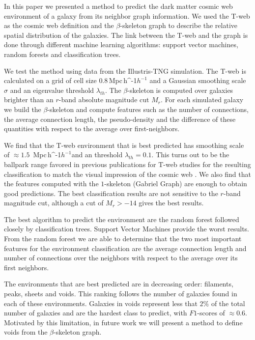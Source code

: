\documentclass[usenatbib]{mnras}
\newcommand{\Mpch}{\,{\rm Mpc}\,\ifmmode h^{-1}\else $h^{-1}$\fi}
\begin{document}
In this paper we presented a method to predict the dark matter cosmic web
environment of a galaxy from its neighbor graph information.
We used the T-web as the cosmic web definition \citep{Forero-Romero2009}
and the $\beta$-skeleton graph \citep{Fang2019} 
to describe the relative spatial distribution of the galaxies. 
The link between the T-web and the graph is done through different
machine learning algorithms: support vector machines, random forests and
classification trees.

We test the method using data from the Illustris-TNG simulation.
The T-web is calculated on a grid of cell size $0.8$\Mpch 
and a Gaussian smoothing scale $\sigma$ and an eigenvalue threshold $\lambda_{th}$.
The $\beta$-skeleton is computed over galaxies brighter than 
an $r$-band absolute magnitude cut $M_{r}$.
For each simulated galaxy we build the $\beta$-skeleton and
compute features such as the number of connections, the average connection
length, the pseudo-density and the difference of these quantities with
respect to the average over first-neighbors.

We find that the T-web environment that is best predicted has smoothing
scale of $\approx1.5$ \Mpch and an threshold $\lambda_{th}=0.1$. 
This turns out to be the ballpark range favored in previous publications
for T-web  studies for the resulting classification to match the visual impression of the cosmic web \citep{Forero-Romero2009}.
We also find that the features computed with the $1$-skeleton 
(Gabriel Graph) are enough to obtain good predictions. 
The best classification results are not sensitive to the $r$-band
magnitude cut, although a cut of $M_r>-14$ gives the best results.

The best algorithm to predict the environment are the random forest followed closely by classification trees. 
Support Vector Machines provide the worst results.
From the random forest we are able to determine that the two most
important features for the environment classification are the average connection length and number of connections over the neighbors with respect to the average over its first neighbors.

The environments that are best predicted are in decreasing order: 
filaments, peaks, sheets and voids. 
This ranking follows the number of galaxies found in each of these environments.
Galaxies in voids represent less that $2\%$ of the total number of galaxies and 
are the hardest class to predict, with $F1$-scores of $\approx0.6$.
Motivated by this limitation, in future work we will present a method to define
voids from the $\beta$-skeleton graph.
\end{document}
